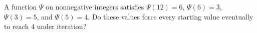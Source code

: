 A function $\Psi$ on nonnegative integers satisfies $\Psi(12)=6$, $\Psi(6)=3$, $\Psi(3)=5$, and $\Psi(5)=4$. Do these values force every starting value eventually to reach $4$ under iteration?
